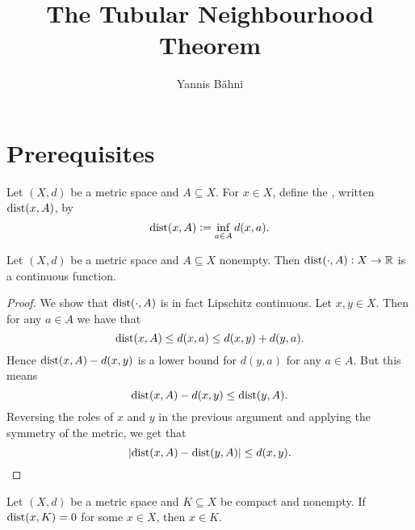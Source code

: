 

\title{The Tubular Neighbourhood Theorem}
\author{Yannis B\"ahni}
\address[Yannis B\"ahni]{University of Zurich, R\"amistrasse 71, 8006 Zurich}



\maketitle
\thispagestyle{fancy}

\section{Prerequisites}

\begin{definition}
	Let $(X,d)$ be a metric space and $A \subseteq X$. For $x \in X$, define the , written $\operatorname{dist}(x,A)$, by
	\begin{equation*}
		\operatorname{dist}(x,A) := \inf_{a \in A} d(x,a).
	\end{equation*}
\end{definition}

\begin{lemma}
	Let $(X,d)$ be a metric space and $A \subseteq X$ nonempty. Then $\operatorname{dist}(\cdot,A): X \to \mathbb{R}$ is a continuous function.
	\label{lem:distance_continuous}
\end{lemma}

\begin{proof}
	We show that $\operatorname{dist}(\cdot,A)$ is in fact Lipschitz continuous. Let $x,y \in X$. Then for any $a \in A$ we have that
	\begin{equation*}
		\operatorname{dist}(x,A) \leq d(x,a) \leq d(x,y) + d(y,a).
	\end{equation*}
	Hence $\operatorname{dist}(x,A) - d(x,y)$ is a lower bound for $d(y,a)$ for any $a \in A$. But this means
	\begin{equation*}
		\operatorname{dist}(x,A) - d(x,y) \leq \operatorname{dist}(y,A).
	\end{equation*}
	Reversing the roles of $x$ and $y$ in the previous argument and applying the symmetry of the metric, we get that 
	\begin{equation*}
		\abs[0]{\operatorname{dist}(x,A) - \operatorname{dist}(y,A)} \leq d(x,y).
	\end{equation*}
\end{proof}

\begin{lemma}
	Let $(X,d)$ be a metric space and $K \subseteq X$ be compact and nonempty. If $\operatorname{dist}(x,K) = 0$ for some $x \in X$, then $x \in K$.
	\label{lem:distance_compact}
\end{lemma}

